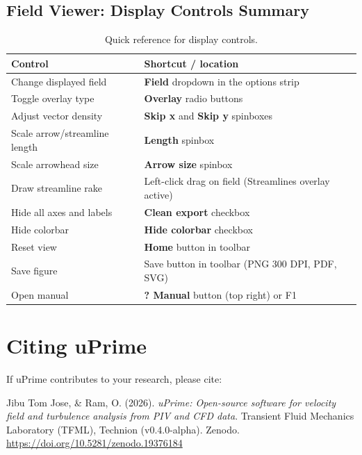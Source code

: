 \documentclass[11pt, a4paper]{report}
\newcommand{\uipth}[1]{\textbf{\textcolor{upblue}{#1}}}
\begin{document}
\section{Field Viewer: Display Controls Summary}

\begin{table}[htbp]
\centering
\caption{Quick reference for display controls.}
\begin{tabular}{ll}
\toprule
\textbf{Control} & \textbf{Shortcut / location} \\
\midrule
Change displayed field     & \uipth{Field} dropdown in the options strip \\
Toggle overlay type        & \uipth{Overlay} radio buttons \\
Adjust vector density      & \uipth{Skip x} and \uipth{Skip y} spinboxes \\
Scale arrow/streamline length & \uipth{Length} spinbox \\
Scale arrowhead size       & \uipth{Arrow size} spinbox \\
Draw streamline rake       & Left-click drag on field (Streamlines overlay active) \\
Hide all axes and labels   & \uipth{Clean export} checkbox \\
Hide colorbar              & \uipth{Hide colorbar} checkbox \\
Reset view                 & \uipth{Home} button in toolbar \\
Save figure                & Save button in toolbar (PNG 300 DPI, PDF, SVG) \\
Open manual                & \uipth{? Manual} button (top right) or F1 \\
\bottomrule
\end{tabular}
\end{table}

\appendix

\chapter{Citing uPrime}

If uPrime contributes to your research, please cite:

\begin{mdframed}[backgroundcolor=uplightgray, linecolor=upboxborder, linewidth=1pt]
Jibu Tom Jose, \& Ram, O. (2026). \textit{uPrime: Open-source software for velocity field and turbulence analysis from PIV and CFD data}. Transient Fluid Mechanics Laboratory (TFML), Technion (v0.4.0-alpha). Zenodo.\\
\url{https://doi.org/10.5281/zenodo.19376184}
\end{mdframed}
\end{document}
